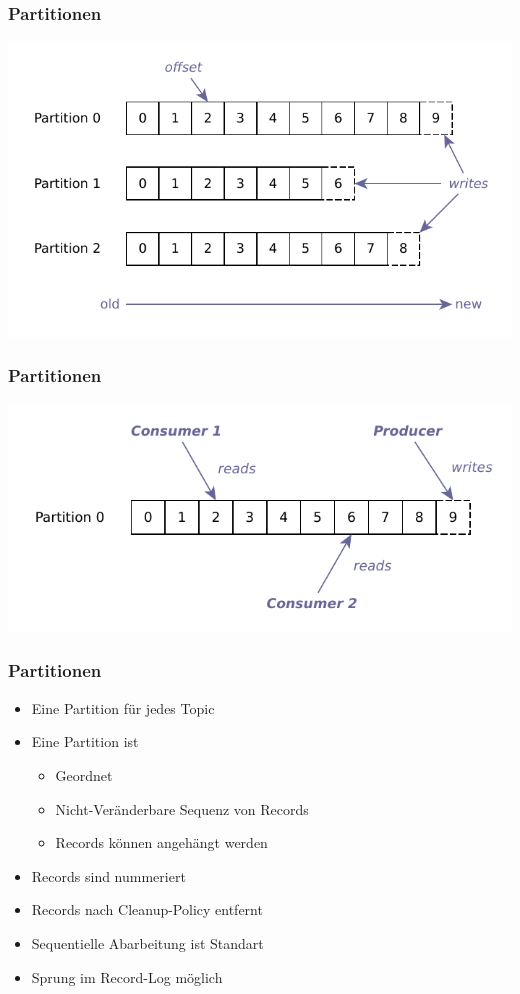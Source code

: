 \begin{frame}
\frametitle{Partitionen}
	\centering
	\includegraphics[scale=0.75]{figure/partitioned_log.pdf}
\end{frame}

\begin{frame}
\frametitle{Partitionen}
\centering
\includegraphics[scale=0.75]{figure/partition.pdf}
\end{frame}

\begin{frame}
\frametitle{Partitionen}
\begin{itemize}
	\item Eine Partition für jedes Topic
	\item Eine Partition ist
	\begin{itemize}
		\item Geordnet
		\item Nicht-Veränderbare Sequenz von Records
		\item Records können angehängt werden
	\end{itemize}
	\item Records sind nummeriert
	\item Records nach Cleanup-Policy entfernt
	\item Sequentielle Abarbeitung ist Standart
	\item Sprung im Record-Log möglich
\end{itemize}
\end{frame}

